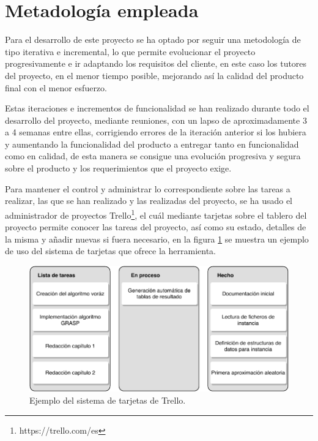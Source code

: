 \section{Metadología empleada}
Para el desarrollo de este proyecto se ha optado por seguir una metodología de tipo iterativa e incremental, lo que permite evolucionar el proyecto progresivamente e ir adaptando los requisitos del cliente, en este caso los tutores del proyecto, en el menor tiempo posible, mejorando así la calidad del producto final con el menor esfuerzo.

Estas iteraciones e incrementos de funcionalidad se han realizado durante todo el desarrollo del proyecto, mediante reuniones, con un lapso de aproximadamente 3 a 4 semanas entre ellas, corrigiendo errores de la iteración anterior si los hubiera y aumentando la funcionalidad del producto a entregar tanto en funcionalidad como en calidad, de esta manera se consigue una evolución progresiva y segura sobre el producto y los requerimientos que el proyecto exige.

Para mantener el control y administrar lo correspondiente sobre las tareas a realizar, las que se han realizado y las realizadas del proyecto, se ha usado el administrador de proyectos Trello\footnote{https://trello.com/es}, el cuál mediante tarjetas sobre el tablero del proyecto permite conocer las tareas del proyecto, así como su estado, detalles de la misma y añadir nuevas si fuera necesario, en la figura \ref{fig:trello-tarjetas} se muestra un ejemplo de uso del sistema de tarjetas que ofrece la herramienta.

\begin{figure}[H]
	\centering
	\includegraphics{Figures/trello-tarjetas.pdf}
	\caption{Ejemplo del sistema de tarjetas de Trello.}
	\label{fig:trello-tarjetas}
\end{figure}

